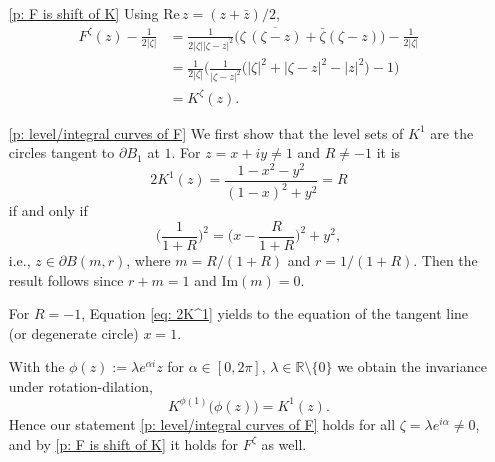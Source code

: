 \documentclass[11pt]{article}
\makeatletter
\renewenvironment{proof}[1][\proofname]{
   \par\pushQED{\qed}\normalfont
   \topsep6\p@\@plus6\p@\relax
   \trivlist\item[\hskip\labelsep\bfseries#1\@addpunct{.}]
   \ignorespaces
}{
   \popQED\endtrivlist\@endpefalse
}
\numberwithin{equation}{section}
\makeatother
\begin{document}
\begin{proof}
  \renewcommand{\qedsymbol}{}
  \begin{itemize}
    \item [\ref{p: F is shift of K}] 
      Using $\text{Re} \,z = (z + \bar{z})/2$, 
      \begin{equation}\nonumber
      \begin{split}
        F^{\zeta}(z) - \frac{1}{2|\zeta|} &= 
        \frac{1}{2|\zeta| |\zeta - z|^2}
          \Big( \zeta\, \overline{(\zeta-z)} + \bar{\zeta} (\zeta -z) \Big) -\frac{1}{2|\zeta|} \\
        & = \frac{1}{2|\zeta|}\bigg( 
          \frac{1}{|\zeta-z|^2} \Big( |\zeta|^2 + |\zeta -z|^2 -|z|^2\Big) -1 \bigg)\\
        &= K^{\zeta}(z).
      \end{split}
      \end{equation}

    \item[\ref{p: level/integral curves of F}] 
      We first show that the level sets of $K^{1}$ 
      are the circles tangent to $\partial B_1$ at $1$. 
      For $z = x+iy \neq 1$ and $R \neq -1$ it is 
      \begin{equation}\label{eq: 2K^1}
        2K^1(z) = \frac{1-x^2-y^2}{(1-x)^2 + y^2} = R
      \end{equation}
      if and only if 
      \begin{equation}\nonumber
        \Big( \frac{1}{1+R} \Big)^2 
        = \Big( x - \frac{R}{1+R} \Big)^2 +y^2,
      \end{equation}  
      i.e., $z \in \partial B(m,r)$, where 
      $m =  R/(1+R)$ and $r=1/(1+R)$.
      Then the result follows since $r+m = 1$ and $\text{Im}(m) = 0$. 

      For $R=-1$, Equation \eqref{eq: 2K^1} yields 
      to the equation of the tangent line (or degenerate circle) $x=1$. 

      With the $\phi(z) := \lambda e^{\alpha i} z$ 
      for $\alpha \in [0,2\pi]$, $\lambda \in \mathbb{R}\setminus \{0\}$
      we obtain the invariance under rotation-dilation,
      \begin{equation}\label{eq: K invariant}
        K^{\phi(1)}\big( \phi(z) \big) = K^1(z).
      \end{equation}
      Hence our statement \ref{p: level/integral curves of F} 
      holds for all $\zeta = \lambda e^{i \alpha} \neq 0$, 
      and by \ref{p: F is shift of K} it holds for $F^{\zeta}$ as well. 


\end{itemize}
\end{proof}
\end{document}
